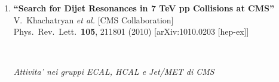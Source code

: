 \documentclass[10pt]{letter}
\begin{document}
\begin{enumerate}
\item%
{\bf ``Search for Dijet Resonances in 7 TeV pp Collisions at CMS''}
  \\{}V.~Khachatryan {\it et al.}  [CMS Collaboration]
  \\{}Phys.\ Rev.\ Lett.\  {\bf 105}, 211801 (2010)
  [arXiv:1010.0203 [hep-ex]]






~\\
\begin{center} \textit{Attivita' nei gruppi ECAL, HCAL e Jet/MET di CMS} \\ 
\end{center}


\end{enumerate}
\end{document}
